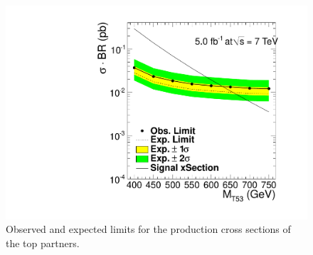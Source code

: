 \begin{figure}[htb]
    \centering
    \includegraphics[width=.9\textwidth]{images/pdf/oLimit_limit_macro_4jets_opt_btag_200_350_02}
    \caption{Observed and expected limits for the production cross sections
    of the top partners.}
    \label{fig:limit}
\end{figure}
